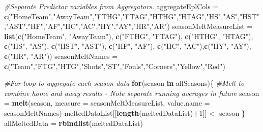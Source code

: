 \documentclass[
]{article}
\newenvironment{Shaded}{\begin{snugshade}}{\end{snugshade}}
\newcommand{\CommentTok}[1]{\textcolor[rgb]{0.56,0.35,0.01}{\textit{#1}}}
\newcommand{\ControlFlowTok}[1]{\textcolor[rgb]{0.13,0.29,0.53}{\textbf{#1}}}
\newcommand{\DataTypeTok}[1]{\textcolor[rgb]{0.13,0.29,0.53}{#1}}
\newcommand{\DecValTok}[1]{\textcolor[rgb]{0.00,0.00,0.81}{#1}}
\newcommand{\KeywordTok}[1]{\textcolor[rgb]{0.13,0.29,0.53}{\textbf{#1}}}
\newcommand{\NormalTok}[1]{#1}
\newcommand{\OperatorTok}[1]{\textcolor[rgb]{0.81,0.36,0.00}{\textbf{#1}}}
\newcommand{\StringTok}[1]{\textcolor[rgb]{0.31,0.60,0.02}{#1}}
\begin{document}
\begin{Shaded}
\begin{Highlighting}[]
{{{{\CommentTok{#Separate Predictor variables from Aggregators.}
\NormalTok{aggregateEplCols =}\StringTok{ }\KeywordTok{c}\NormalTok{(}\StringTok{"HomeTeam"}\NormalTok{,}\StringTok{"AwayTeam"}\NormalTok{,}\StringTok{"FTHG"}\NormalTok{,}\StringTok{"FTAG"}\NormalTok{,}\StringTok{"HTHG"}\NormalTok{,}\StringTok{"HTAG"}\NormalTok{,}\StringTok{"HS"}\NormalTok{,}\StringTok{"AS"}\NormalTok{,}\StringTok{"HST"}\NormalTok{,}\StringTok{"AST"}\NormalTok{,}\StringTok{"HF"}\NormalTok{,}\StringTok{"AF"}\NormalTok{,}\StringTok{"HC"}\NormalTok{,}\StringTok{"AC"}\NormalTok{,}\StringTok{"HY"}\NormalTok{,}\StringTok{"AY"}\NormalTok{,}\StringTok{"HR"}\NormalTok{,}\StringTok{"AR"}\NormalTok{)}
\NormalTok{seasonMeltMeasureList =}\StringTok{ }\KeywordTok{list}\NormalTok{(}\KeywordTok{c}\NormalTok{(}\StringTok{"HomeTeam"}\NormalTok{, }\StringTok{"AwayTeam"}\NormalTok{), }\KeywordTok{c}\NormalTok{(}\StringTok{"FTHG"}\NormalTok{, }\StringTok{"FTAG"}\NormalTok{), }\KeywordTok{c}\NormalTok{(}\StringTok{"HTHG"}\NormalTok{, }\StringTok{"HTAG"}\NormalTok{), }\KeywordTok{c}\NormalTok{(}\StringTok{"HS"}\NormalTok{, }\StringTok{"AS"}\NormalTok{), }\KeywordTok{c}\NormalTok{(}\StringTok{"HST"}\NormalTok{, }\StringTok{"AST"}\NormalTok{), }\KeywordTok{c}\NormalTok{(}\StringTok{"HF"}\NormalTok{, }\StringTok{"AF"}\NormalTok{), }\KeywordTok{c}\NormalTok{(}\StringTok{"HC"}\NormalTok{, }\StringTok{"AC"}\NormalTok{),}\KeywordTok{c}\NormalTok{(}\StringTok{"HY"}\NormalTok{, }\StringTok{"AY"}\NormalTok{), }\KeywordTok{c}\NormalTok{(}\StringTok{"HR"}\NormalTok{, }\StringTok{"AR"}\NormalTok{))}
\NormalTok{seasonMeltNames =}\StringTok{ }\KeywordTok{c}\NormalTok{(}\StringTok{"Team"}\NormalTok{,}\StringTok{"FTG"}\NormalTok{,}\StringTok{"HTG"}\NormalTok{,}\StringTok{"Shots"}\NormalTok{,}\StringTok{"ST"}\NormalTok{,}\StringTok{"Fouls"}\NormalTok{,}\StringTok{"Corners"}\NormalTok{,}\StringTok{"Yellow"}\NormalTok{,}\StringTok{"Red"}\NormalTok{)}

\CommentTok{#For loop to aggregate each season data}
\ControlFlowTok{for}\NormalTok{(season }\ControlFlowTok{in}\NormalTok{ allSeasons)\{}
  \CommentTok{#Melt to combine home and away results - Note separate running averages in future}
\NormalTok{  season =}\StringTok{ }\KeywordTok{melt}\NormalTok{(season, }\DataTypeTok{measure =}\NormalTok{ seasonMeltMeasureList, }\DataTypeTok{value.name =}\NormalTok{ seasonMeltNames)}
\NormalTok{  meltedDataList[[}\KeywordTok{length}\NormalTok{(meltedDataList)}\OperatorTok{+}\DecValTok{1}\NormalTok{]] <-}\StringTok{ }\NormalTok{season}
\NormalTok{\}}
\NormalTok{allMeltedData =}\StringTok{ }\KeywordTok{rbindlist}\NormalTok{(meltedDataList)}

}}}}
\end{Highlighting}
\end{Shaded}
\end{document}
